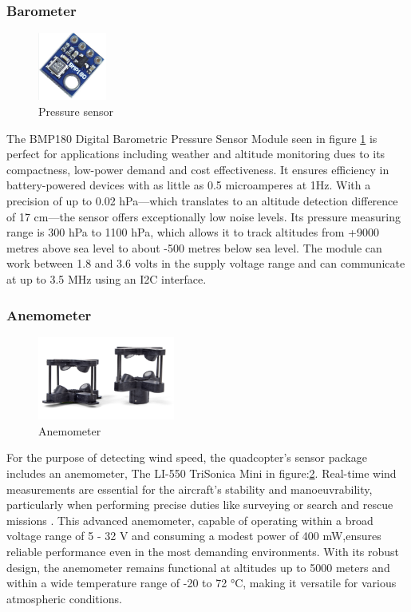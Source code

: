 \documentclass{article}
\begin{document}
\subsubsection{Barometer}
\begin{figure}[H]
  \centering
  \includegraphics[width=0.2\textwidth]{Pictures/bmp180.png}
  \caption{Pressure sensor}
  \label{fig:bmp180}
\end{figure}
The BMP180 Digital Barometric Pressure Sensor Module seen in figure \ref{fig:bmp180} is perfect for applications including weather and altitude monitoring dues to its compactness, low-power demand and cost effectiveness. It ensures efficiency in battery-powered devices with as little as 0.5 microamperes at 1Hz. With a precision of up to 0.02 hPa—which translates to an altitude detection difference of 17 cm—the sensor offers exceptionally 
low noise levels. Its pressure measuring range is 300 hPa to 1100 hPa, which allows it to track altitudes from +9000 metres above sea level to about -500 metres below sea level. The module can work between 1.8 and 3.6 volts in the supply voltage range and can communicate at up to 3.5 MHz using an I2C interface.

\subsubsection{Anemometer}
\begin{figure}[H]
  \centering
  \includegraphics[width=0.4\textwidth]{Pictures/Anemometer.png}
  \caption{Anemometer}
  \label{fig:Anemometer}
\end{figure}

For the purpose of detecting wind speed, the quadcopter's sensor package includes an anemometer, The LI-550 TriSonica Mini in figure:\ref{fig:Anemometer}. Real-time wind measurements are essential for the aircraft's stability and manoeuvrability, particularly when performing precise duties like surveying or search and rescue missions \cite{uav_wilderness_sar}. This advanced anemometer, capable of operating within a broad voltage range of 5 - 32 V and consuming a modest power of 400 mW,ensures reliable performance even in the most demanding environments.
With its robust design, the anemometer remains functional at altitudes up to 5000 meters and within a wide temperature range of -20 to 72 °C, making it versatile for various atmospheric conditions.
\end{document}
